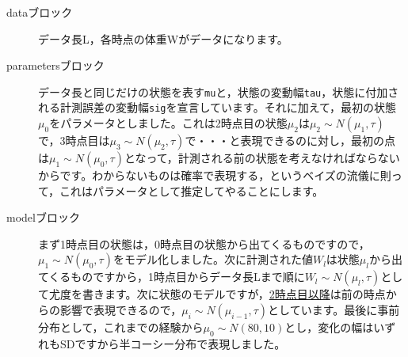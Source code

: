 \begin{description}
	\item[dataブロック] データ長L，各時点の体重Wがデータになります。
	\item[parametersブロック] データ長と同じだけの状態を表す\verb|mu|と，状態の変動幅\verb|tau|，状態に付加される計測誤差の変動幅\verb|sig|を宣言しています。それに加えて，最初の状態$\mu_0$をパラメータとしました。これは2時点目の状態$\mu_2$は$\mu_2 \sim N(\mu_1,\tau)$で，3時点目は$\mu_3 \sim N(\mu_2,\tau)$で・・・と表現できるのに対し，最初の点は$\mu_1 \sim N(\mu_0, \tau)$となって，計測される前の状態を考えなければならないからです。わからないものは確率で表現する，というベイズの流儀に則って，これはパラメータとして推定してやることにします。
	\item[modelブロック] まず1時点目の状態は，0時点目の状態から出てくるものですので，$\mu_1 \sim N(\mu_0,\tau)$をモデル化しました。次に計測された値$W_l$は状態$\mu_l$から出てくるものですから，1時点目からデータ長Lまで順に$W_l \sim N(\mu_l,\tau)$として尤度を書きます。次に状態のモデルですが，\underline{2時点目以降}は前の時点からの影響で表現できるので，$\mu_i \sim N(\mu_{i-1}, \tau)$としています。最後に事前分布として，これまでの経験から$\mu_0 \sim N(80,10)$とし，変化の幅はいずれもSDですから半コーシー分布で表現しました。
\end{description}
